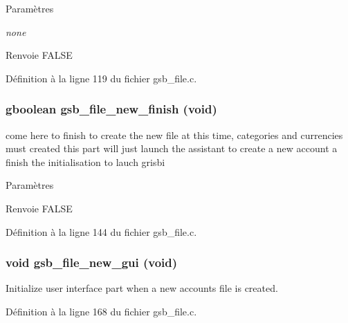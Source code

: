 \begin{DoxyParams}{Paramètres}
\item[{\em none}]\end{DoxyParams}
\begin{DoxyReturn}{Renvoie}
FALSE 
\end{DoxyReturn}


Définition à la ligne 119 du fichier gsb\_\-file.c.

\subsubsection[{gsb\_\-file\_\-new\_\-finish}]{\setlength{\rightskip}{0pt plus 5cm}gboolean gsb\_\-file\_\-new\_\-finish (void)}\label{gsb__file_8c_afcc94609c83a3074948e9fa10ad592ee}
come here to finish to create the new file at this time, categories and currencies must created this part will just launch the assistant to create a new account a finish the initialisation to lauch grisbi


\begin{DoxyParams}{Paramètres}
\item[{\em }]\end{DoxyParams}
\begin{DoxyReturn}{Renvoie}
FALSE 
\end{DoxyReturn}


Définition à la ligne 144 du fichier gsb\_\-file.c.

\subsubsection[{gsb\_\-file\_\-new\_\-gui}]{\setlength{\rightskip}{0pt plus 5cm}void gsb\_\-file\_\-new\_\-gui (void)}\label{gsb__file_8c_a6905aa328e960638de7ede0c72e89d32}
Initialize user interface part when a new accounts file is created. 

Définition à la ligne 168 du fichier gsb\_\-file.c.


